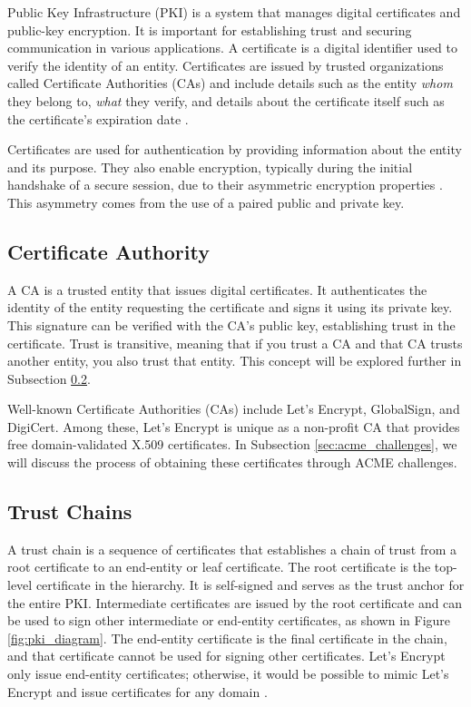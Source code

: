 Public Key Infrastructure (PKI) is a system that manages digital certificates and public-key encryption. It is important for establishing trust and securing communication in various applications. A certificate is a digital identifier used to verify the identity of an entity. Certificates are issued by trusted organizations called Certificate Authorities (CAs) and include details such as the entity \textit{whom} they belong to, \textit{what} they verify, and details about the certificate itself such as the certificate's expiration date \Parencite{ibm_digital_certificates}.

Certificates are used for authentication by providing information about the entity and its purpose. They also enable encryption, typically during the initial handshake of a secure session, due to their asymmetric encryption properties \Parencite{cloudflare_tls_handshake}. This asymmetry comes from the use of a paired public and private key.

\subsection{Certificate Authority}
A CA is a trusted entity that issues digital certificates. It authenticates the identity of the entity requesting the certificate and signs it using its private key. This signature can be verified with the CA's public key, establishing trust in the certificate. Trust is transitive, meaning that if you trust a CA and that CA trusts another entity, you also trust that entity. This concept will be explored further in Subsection \ref{sec:trust_chains}.

Well-known Certificate Authorities (CAs) include Let's Encrypt, GlobalSign, and DigiCert. Among these, Let's Encrypt is unique as a non-profit CA that provides free domain-validated X.509 certificates. In Subsection \ref{sec:acme_challenges}, we will discuss the process of obtaining these certificates through ACME challenges.

\subsection{Trust Chains} \label{sec:trust_chains}
A trust chain is a sequence of certificates that establishes a chain of trust from a root certificate to an end-entity or leaf certificate. The root certificate is the top-level certificate in the hierarchy. It is self-signed and serves as the trust anchor for the entire PKI. Intermediate certificates are issued by the root certificate and can be used to sign other intermediate or end-entity certificates, as shown in Figure \ref{fig:pki_diagram}. The end-entity certificate is the final certificate in the chain, and that certificate cannot be used for signing other certificates. Let's Encrypt only issue end-entity certificates; otherwise, it would be possible to mimic Let's Encrypt and issue certificates for any domain \Parencite{letsencrypt_certificates}.

